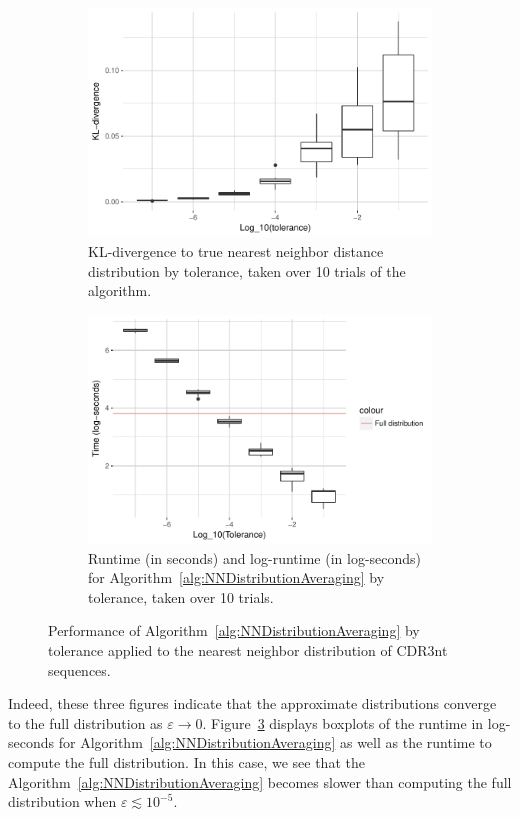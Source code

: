 \documentclass{article}
\begin{document}
\begin{figure}
\begin{subfigure}[b]{.49\textwidth}
        \includegraphics[width=\linewidth]{Figures/NearestNeighbor/CDR3/div_by_tol.pdf}
    	\caption{KL-divergence to true nearest neighbor distance distribution by tolerance, taken over 10 trials of the algorithm.}
    	\label{fig:NNDivergences}
	\end{subfigure}
    \begin{subfigure}[b]{.49\textwidth}
    	\includegraphics[width=0.9\linewidth]{Figures/NearestNeighbor/CDR3/log_time_by_tol.pdf}
    	\caption{Runtime (in seconds) and log-runtime (in log-seconds) for Algorithm~\ref{alg:NNDistributionAveraging} by tolerance, taken over 10 trials.}
    	\label{fig:NNTimes}
    \end{subfigure}
    \caption{Performance of Algorithm~\ref{alg:NNDistributionAveraging} by tolerance applied to the nearest neighbor distribution of CDR3nt sequences.}
\end{figure}
Indeed, these three figures indicate that the approximate distributions converge to the full distribution as $\varepsilon \to 0$.
Figure~\ref{fig:NNTimes} displays boxplots of the runtime in log-seconds for Algorithm~\ref{alg:NNDistributionAveraging} as well as the runtime to compute the full distribution.
In this case, we see that the Algorithm~\ref{alg:NNDistributionAveraging} becomes slower than computing the full distribution when $\varepsilon \lesssim 10^{-5}$.
\end{document}

